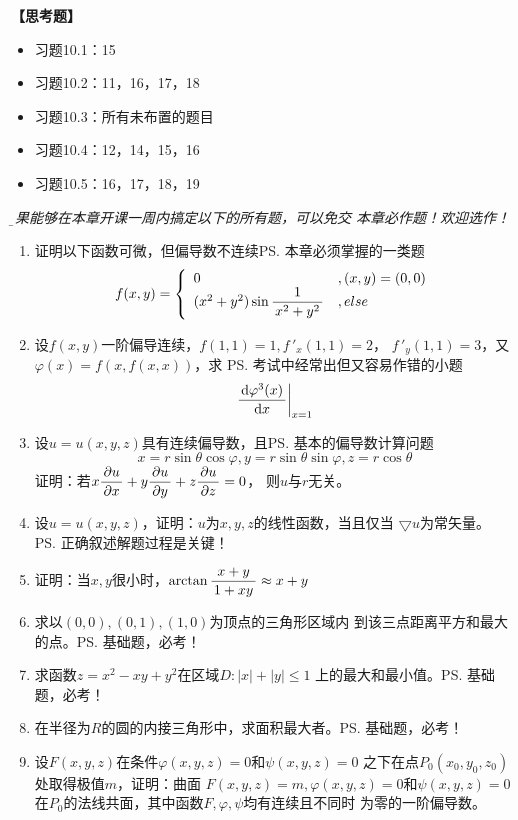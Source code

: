 {\bf 【思考题】}

\begin{itemize}
  \setlength{\itemindent}{1cm}
  \item 习题10.1：15
  \item 习题10.2：11，16，17，18
  \item 习题10.3：所有未布置的题目
  \item 习题10.4：12，14，15，16
  \item 习题10.5：16，17，18，19
\end{itemize}

{\it\b 如果能够在本章开课一周内搞定以下的所有题，可以免交
本章必作题！欢迎选作！}

\begin{enumerate}
  \setlength{\itemindent}{1cm}
  \item 证明以下函数可微，但偏导数不连续\ps{本章必须掌握的一类题}
  	$$
	f(x,y)=\left\{\begin{array}{ll}
	0 & ,(x,y)=(0,0)\\
	(x^2+y^2)\sin\displaystyle\frac{\,{1}\,}{\,{x^2+y^2}\,}& ,else
	\end{array}\right.
	$$
  \item 设$f(x,y)$一阶偏导连续，$f(1,1)=1,f\,'_x(1,1)=2$，
	$f\,'_y(1,1)=3$，又$\varphi(x)=f(x,f(x,x))$，求
	\ps{考试中经常出但又容易作错的小题}
	$$\left.\displaystyle\frac{\,{\mathrm{d}\varphi^3(x)}\,}{\,{\mathrm{d} x}\,}\right|_{x=1}$$
  \item 设$u=u(x,y,z)$具有连续偏导数，且\ps{基本的偏导数计算问题}
	$$x=r\sin\theta\cos\varphi,y=r\sin\theta\sin\varphi,z=r\cos\theta$$
	证明：若$x\displaystyle\frac{\,{\partial u}\,}{\,{\partial x}\,}+y\displaystyle\frac{\,{\partial u}\,}{\,{\partial y}\,}+z\displaystyle\frac{\,{\partial u}\,}{\,{\partial z}\,}=0$，
	则$u$与$r$无关。
  \item 设$u=u(x,y,z)$，证明：$u$为$x,y,z$的线性函数，当且仅当
	$\bigtriangledown u$为常矢量。	\ps{正确叙述解题过程是关键！}
  \item 证明：当$x,y$很小时，$\arctan\displaystyle\frac{\,{x+y}\,}{\,{1+xy}\,}\approx x+y$
  \item 求以$(0,0),(0,1),(1,0)$为顶点的三角形区域内
	到该三点距离平方和最大的点。\ps{基础题，必考！}
  \item 求函数$z=x^2-xy+y^2$在区域$D:|x|+|y|\leq 1$
	上的最大和最小值。\ps{基础题，必考！}
  \item 在半径为$R$的圆的内接三角形中，求面积最大者。\ps{基础题，必考！}
  \item 设$F(x,y,z)$在条件$\varphi(x,y,z)=0$和$\psi(x,y,z)=0$
	之下在点$P_0(x_0,y_0,z_0)$处取得极值$m$，证明：曲面
	$F(x,y,z)=m,\varphi(x,y,z)=0$和$\psi(x,y,z)=0$
	在$P_0$的法线共面，其中函数$F,\varphi,\psi$均有连续且不同时
	为零的一阶偏导数。
\end{enumerate}

